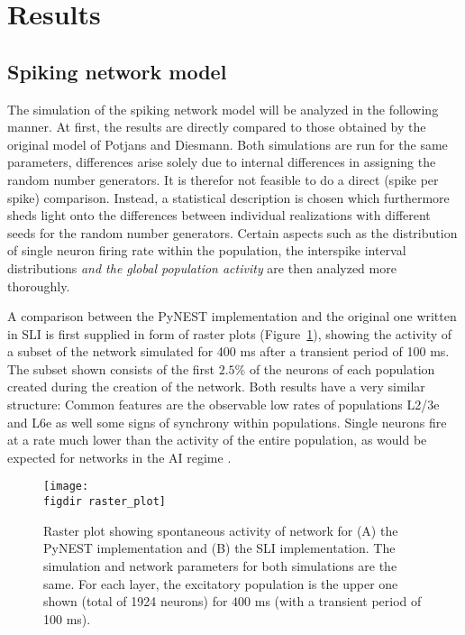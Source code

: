 \section{Results}
\label{sec:results}

\subsection{Spiking network model}
The simulation of the spiking network model will be analyzed in the following manner. 
At first, the results are directly compared to those obtained by the original 
model of Potjans and Diesmann. Both simulations are run for the same parameters, 
differences arise solely due to internal differences in assigning the random 
number generators. It is therefor not feasible to do a direct (spike per spike) 
comparison. Instead, a statistical description is chosen which furthermore sheds light
onto the differences between individual realizations with different seeds for the 
random number generators. Certain aspects such as
the distribution of single neuron firing rate within the population, 
the interspike interval distributions 
\emph{and the global population activity} 
are then analyzed more thoroughly. 

A comparison between the PyNEST implementation and the original one written in SLI
is first supplied in form of raster plots (Figure~\ref{fig:raster_plot}), 
showing the activity of a subset of the network simulated for 400 ms 
after a transient period of 100 ms. The subset shown consists of the first 
$2.5 \%$ of the neurons of each population created during the creation of the network. 
Both results have a very similar structure: Common features are the observable low 
rates of populations L2/3e and L6e as well some signs of synchrony within populations. 
Single neurons fire at a rate much lower than the activity of the 
entire population, as would be expected for networks in the AI regime \cite{brunel2000}. 
\begin{figure}[tb]
    \centering
    \texttt{[image: \\figdir raster\_plot]}
    \caption{Raster plot showing spontaneous activity of network for 
        (A) the PyNEST implementation and (B) the SLI implementation.
        The simulation and network parameters for both simulations are 
        the same. 
        For each layer, the excitatory population is the upper one shown 
        (total of 1924 neurons) for $400$ ms (with a transient period of 100 ms). 
    }
    \label{fig:raster_plot}
\end{figure}

